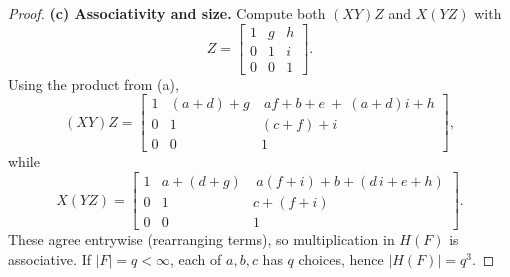 \documentclass[12pt]{article}
\theoremstyle{definition}
\begin{document}
\begin{proof}
\smallskip
\textbf{(c) Associativity and size.} Compute both $(XY)Z$ and $X(YZ)$ with
\[
Z=\begin{bmatrix}1&g&h\\[2pt]0&1&i\\[2pt]0&0&1\end{bmatrix}.
\]
Using the product from (a),
\[
(XY)Z=\begin{bmatrix}
1&(a+d)+g&\ a f+b+e\ +\ (a+d)i+h\\
0&1&(c+f)+i\\
0&0&1
\end{bmatrix},
\]
while
\[
X(YZ)=\begin{bmatrix}
1&a+(d+g)&\ a(f+i)+b+(d\,i+e+h)\\
0&1&c+(f+i)\\
0&0&1
\end{bmatrix}.
\]
These agree entrywise (rearranging terms), so multiplication in $H(F)$ is associative.
If $|F|=q<\infty$, each of $a,b,c$ has $q$ choices, hence $|H(F)|=q^3$.


\end{proof}
\end{document}
